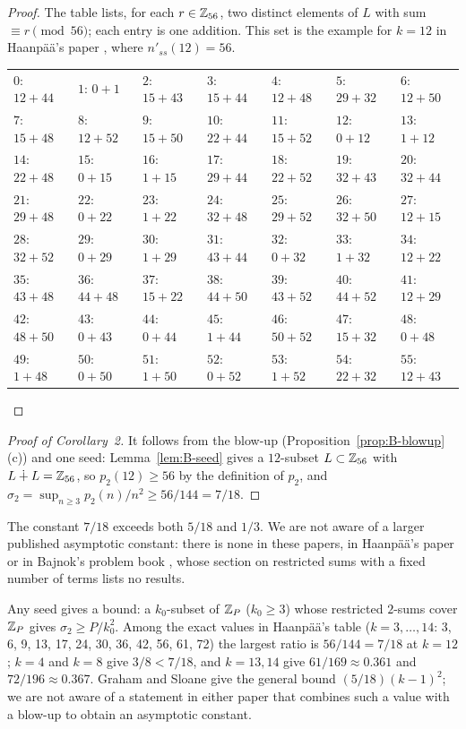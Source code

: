\documentclass[11pt]{article}
\begin{document}
\begin{proof}
The table lists, for each $r \in \mathbb{Z}_{56}$, two distinct elements of $L$ with sum $\equiv r \pmod{56}$;
each entry is one addition. This set is the example for $k = 12$ in Haanp\"a\"a's paper \cite{Haanpaa}, where
$n'_{ss}(12) = 56$.
\begin{center}\scriptsize
\begin{tabular}{lllllll}
$0$: $12+44$ & $1$: $0+1$ & $2$: $15+43$ & $3$: $15+44$ & $4$: $12+48$ & $5$: $29+32$ & $6$: $12+50$\\
$7$: $15+48$ & $8$: $12+52$ & $9$: $15+50$ & $10$: $22+44$ & $11$: $15+52$ & $12$: $0+12$ & $13$: $1+12$\\
$14$: $22+48$ & $15$: $0+15$ & $16$: $1+15$ & $17$: $29+44$ & $18$: $22+52$ & $19$: $32+43$ & $20$: $32+44$\\
$21$: $29+48$ & $22$: $0+22$ & $23$: $1+22$ & $24$: $32+48$ & $25$: $29+52$ & $26$: $32+50$ & $27$: $12+15$\\
$28$: $32+52$ & $29$: $0+29$ & $30$: $1+29$ & $31$: $43+44$ & $32$: $0+32$ & $33$: $1+32$ & $34$: $12+22$\\
$35$: $43+48$ & $36$: $44+48$ & $37$: $15+22$ & $38$: $44+50$ & $39$: $43+52$ & $40$: $44+52$ & $41$: $12+29$\\
$42$: $48+50$ & $43$: $0+43$ & $44$: $0+44$ & $45$: $1+44$ & $46$: $50+52$ & $47$: $15+32$ & $48$: $0+48$\\
$49$: $1+48$ & $50$: $0+50$ & $51$: $1+50$ & $52$: $0+52$ & $53$: $1+52$ & $54$: $22+32$ & $55$: $12+43$
\end{tabular}
\end{center}

\end{proof}

\begin{proof}[Proof of Corollary~2]
It follows from the blow-up (Proposition~\ref{prop:B-blowup}(c)) and one seed: Lemma~\ref{lem:B-seed} gives a
$12$-subset $L \subset \mathbb{Z}_{56}$ with $L \dotplus L = \mathbb{Z}_{56}$, so $p_2(12) \ge 56$ by the definition of $p_2$,
and $\sigma_2 = \sup_{n \ge 3} p_2(n)/n^2 \ge 56/144 = 7/18$.
\end{proof}

The constant $7/18$ exceeds both $5/18$ and $1/3$. We are not aware of a larger published asymptotic
constant: there is none in these papers, in Haanp\"a\"a's paper or in Bajnok's problem book \cite{Bajnok},
whose section on restricted sums with a fixed number of terms lists no results.

\begin{remark}[Why $12$]
Any seed gives a bound: a $k_0$-subset of $\mathbb{Z}_P$ ($k_0 \ge 3$) whose restricted $2$-sums cover $\mathbb{Z}_P$ gives
$\sigma_2 \ge P/k_0^2$. Among the exact values in
Haanp\"a\"a's table \cite{Haanpaa} ($k = 3, \dots, 14$: 3, 6, 9, 13, 17, 24, 30, 36, 42, 56, 61, 72) the largest
ratio is $56/144 = 7/18$ at $k = 12$; $k = 4$ and $k = 8$ give $3/8 < 7/18$, and $k = 13, 14$ give
$61/169 \approx 0.361$ and $72/196 \approx 0.367$. Graham and Sloane \cite{GS} give the general bound $(5/18)(k-1)^2$; we are not aware of a statement in
either paper that combines such a value with a blow-up to obtain an asymptotic constant.
\end{remark}
\end{document}
